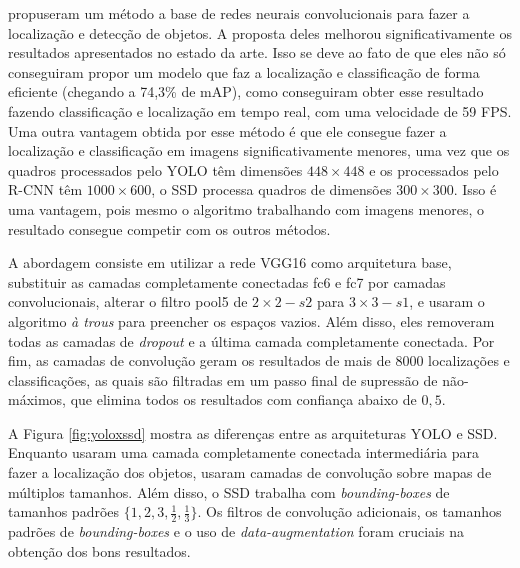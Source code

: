  propuseram um método a base de redes neurais convolucionais para fazer a localização e detecção de objetos. A proposta deles melhorou significativamente os resultados apresentados no estado da arte. Isso se deve ao fato de que eles não só conseguiram propor um modelo que faz a localização e classificação de forma eficiente (chegando a 74,3\% de \ac{mAP}), como conseguiram obter esse resultado fazendo classificação e localização em tempo real, com uma velocidade de 59 \ac{FPS}. Uma outra vantagem obtida por esse método é que ele consegue fazer a localização e classificação em imagens significativamente menores, uma vez que os quadros processados pelo \ac{YOLO} têm dimensões $448 \times 448$ e os processados pelo \ac{R-CNN} têm $1000\times 600$, o \ac{SSD} processa quadros de dimensões $300 \times 300$. Isso é uma vantagem, pois mesmo o algoritmo trabalhando com imagens menores, o resultado consegue competir com os outros métodos.

A abordagem consiste em utilizar a rede VGG16 \cite{simonyan-2014} como arquitetura base, substituir as camadas completamente conectadas fc6 e fc7 por camadas convolucionais, alterar o filtro pool5 de $2 \times 2 - s2$ para $3 \times 3 - s1$, e usaram o algoritmo \textit{à trous}\cite{holschneider-1990} para preencher os espaços vazios. Além disso, eles removeram todas as camadas de \textit{dropout} e a última camada completamente conectada. Por fim, as camadas de convolução geram os resultados de mais de 8000 localizações e classificações, as quais são filtradas em um passo final de supressão de não-máximos, que elimina todos os resultados com confiança abaixo de $0,5$.

A Figura \ref{fig:yoloxssd} mostra as diferenças entre as arquiteturas \ac{YOLO} e \ac{SSD}. Enquanto  usaram uma camada completamente conectada intermediária para fazer a localização dos objetos,  usaram camadas de convolução sobre mapas de múltiplos tamanhos. Além disso, o \ac{SSD} trabalha com \textit{bounding-boxes} de tamanhos padrões $\{1, 2, 3, \frac{1}{2}, \frac{1}{3}\}$. Os filtros de convolução adicionais, os tamanhos padrões de \textit{bounding-boxes} e o uso de \textit{data-augmentation} foram cruciais na obtenção dos bons resultados.

